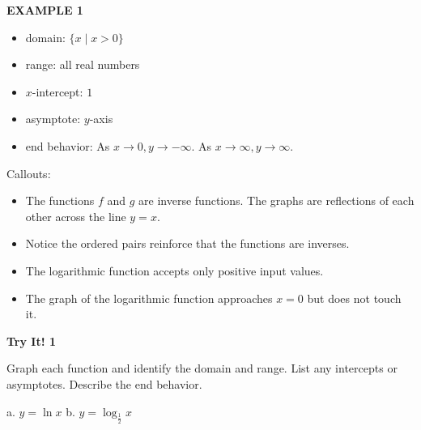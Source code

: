 \documentclass{article}
\newenvironment{example}[1]{\textbf{EXAMPLE #1}\par}{\par}
\newenvironment{tryit}[1]{\textbf{Try It! #1}\par}{\par}
\begin{document}
\begin{example}{1}
\begin{itemize}
    \item domain: $\{x \mid x > 0\}$
    \item range: all real numbers
    \item $x$-intercept: $1$
    \item asymptote: $y$-axis
    \item end behavior: As $x \to 0, y \to -\infty$. As $x \to \infty, y \to \infty$.
\end{itemize}

Callouts:
\begin{itemize}
    \item The functions $f$ and $g$ are inverse functions. The graphs are reflections of each other across the line $y = x$.
    \item Notice the ordered pairs reinforce that the functions are inverses.
    \item The logarithmic function accepts only positive input values.
    \item The graph of the logarithmic function approaches $x = 0$ but does not touch it.
\end{itemize}
\end{example}

\begin{tryit}{1}
Graph each function and identify the domain and range. List any intercepts or asymptotes. Describe the end behavior.

a. $y = \ln x$ \qquad b. $y = \log_{\frac{1}{2}} x$
\end{tryit}
\end{document}
